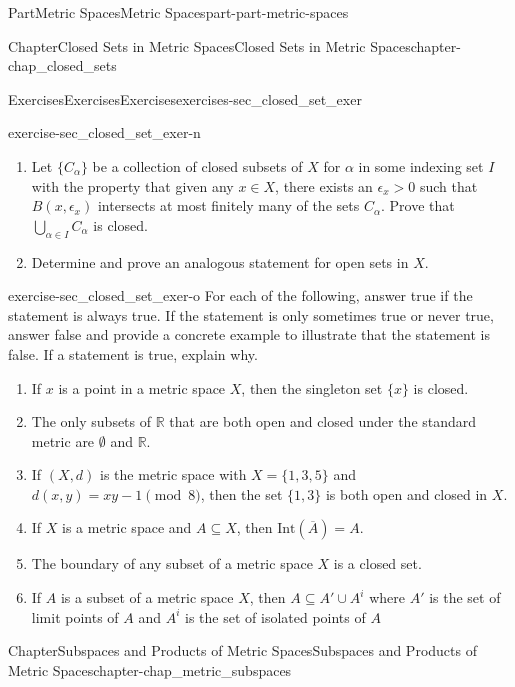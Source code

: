 \documentclass[oneside,10pt,]{book}
\numberwithin{equation}{chapter}
\newcommand{\R}{\mathbb{R}}
\newcommand{\Int}{\text{Int}}
\newcommand{\gt}{>}
\begin{document}
\begin{partptx}{Part}{Metric Spaces}{}{Metric Spaces}{}{}{part-part-metric-spaces}
\begin{chapterptx}{Chapter}{Closed Sets in Metric Spaces}{}{Closed Sets in Metric Spaces}{}{}{chapter-chap_closed_sets}
\begin{exercises-section}{Exercises}{Exercises}{}{Exercises}{}{}{exercises-sec_closed_set_exer}
\begin{divisionexercise}{14}{}{}{exercise-sec_closed_set_exer-n}
\begin{enumerate}[font=\bfseries,label=(\alph*),ref=\alph*]
\item{}Let \(\{C_{\alpha}\}\) be a collection of closed subsets of \(X\) for \(\alpha\) in some indexing set \(I\) with the property that given any \(x \in X\), there exists an \(\epsilon_x \gt 0\) such that \(B(x, \epsilon_x)\) intersects at most finitely many of the sets \(C_{\alpha}\). Prove that \(\bigcup_{\alpha \in I} C_{\alpha}\) is closed.%
\item{}Determine and prove an analogous statement for open sets in \(X\).%
\end{enumerate}%
\end{divisionexercise}%
\begin{divisionexercise}{15}{}{}{exercise-sec_closed_set_exer-o}%
For each of the following, answer true if the statement is always true. If the statement is only sometimes true or never true, answer false and provide a concrete example to illustrate that the statement is false. If a statement is true, explain why.%
\begin{enumerate}[font=\bfseries,label=(\alph*),ref=\alph*]%
\item{}If \(x\) is a point in a metric space \(X\), then the singleton set \(\{x\}\) is closed.%
\item{}The only subsets of \(\R\) that are both open and closed under the standard metric are \(\emptyset\) and \(\R\).%
\item{}If \((X,d)\) is the metric space with \(X = \{1,3,5\}\) and \(d(x,y) = xy - 1 \pmod{8}\), then the set \(\{1,3\}\) is both open and closed in \(X\).%
\item{}If \(X\) is a metric space and \(A \subseteq X\), then \(\Int(\overline{A}) = A\).%
\item{}The boundary of any subset of a metric space \(X\) is a closed set.%
\item{}If \(A\) is a subset of a metric space \(X\), then \(A \subseteq A' \cup A^i\) where \(A'\) is the set of limit points of \(A\) and \(A^i\) is the set of isolated points of \(A\)%
\end{enumerate}%
\end{divisionexercise}%
\end{exercises-section}
\end{chapterptx}
%
\typeout{************************************************}
\typeout{************************************************}
%
\begin{chapterptx}{Chapter}{Subspaces and Products of Metric Spaces}{}{Subspaces and Products of Metric Spaces}{}{}{chapter-chap_metric_subspaces}

\end{chapterptx}
\end{partptx}
\end{document}
